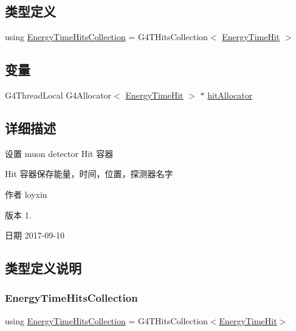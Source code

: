 \subsection*{类型定义}
\begin{DoxyCompactItemize}
\item 
using \hyperlink{EnergyTimeHit_8hh_a16746facffb48be663356f32939fd35f}{Energy\+Time\+Hits\+Collection} = G4\+T\+Hits\+Collection$<$ \hyperlink{classEnergyTimeHit}{Energy\+Time\+Hit} $>$
\end{DoxyCompactItemize}
\subsection*{变量}
\begin{DoxyCompactItemize}
\item 
G4\+Thread\+Local G4\+Allocator$<$ \hyperlink{classEnergyTimeHit}{Energy\+Time\+Hit} $>$ $\ast$ \hyperlink{EnergyTimeHit_8hh_ad468c55ae1e9db9da0cf986eb120230f}{hit\+Allocator}
\end{DoxyCompactItemize}


\subsection{详细描述}
设置 muon detector Hit 容器 

Hit 容器保存能量，时间，位置，探测器名字 \begin{DoxyAuthor}{作者}
loyxin 
\end{DoxyAuthor}
\begin{DoxyVersion}{版本}
1. 
\end{DoxyVersion}
\begin{DoxyDate}{日期}
2017-\/09-\/10 
\end{DoxyDate}


\subsection{类型定义说明}
\mbox{\label{EnergyTimeHit_8hh_a16746facffb48be663356f32939fd35f}} 
\subsubsection{\texorpdfstring{Energy\+Time\+Hits\+Collection}{EnergyTimeHitsCollection}}
{\footnotesize\ttfamily using \hyperlink{EnergyTimeHit_8hh_a16746facffb48be663356f32939fd35f}{Energy\+Time\+Hits\+Collection} =  G4\+T\+Hits\+Collection$<$\hyperlink{classEnergyTimeHit}{Energy\+Time\+Hit}$>$}



